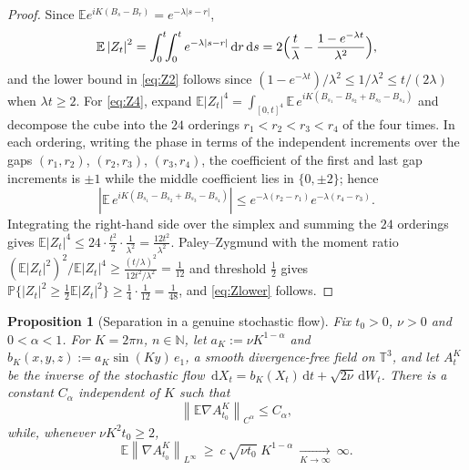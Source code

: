 \documentclass[11pt,reqno]{amsart}
\newcommand{\T}{\mathbb{T}}
\newcommand{\E}{\mathbb{E}}
\newcommand{\Pp}{\mathbb{P}}
\newcommand{\dd}{\,\mathrm{d}}
\newcommand{\norm}[1]{\left\lVert #1\right\rVert}
\newcommand{\abs}[1]{\left\lvert #1\right\rvert}
\newtheorem{proposition}[theorem]{Proposition}
\theoremstyle{definition}
\begin{document}
\begin{proof}
Since $\E e^{iK(B_s-B_r)}=e^{-\lambda\abs{s-r}}$,
\[
  \E\abs{Z_t}^2=\int_0^t\!\!\int_0^t e^{-\lambda\abs{s-r}}\dd r\dd s
  =2\Bigl(\frac{t}{\lambda}-\frac{1-e^{-\lambda t}}{\lambda^2}\Bigr),
\]
and the lower bound in \eqref{eq:Z2} follows since
$(1-e^{-\lambda t})/\lambda^2\le1/\lambda^2\le t/(2\lambda)$ when $\lambda t\ge2$. For
\eqref{eq:Z4}, expand
$\E\abs{Z_t}^4=\int_{[0,t]^4}\E\,e^{iK(B_{s_1}-B_{s_2}+B_{s_3}-B_{s_4})}$ and decompose the
cube into the $24$ orderings $r_1<r_2<r_3<r_4$ of the four times. In each ordering, writing
the phase in terms of the independent increments over the gaps $(r_1,r_2)$, $(r_2,r_3)$,
$(r_3,r_4)$, the coefficient of the first and last gap increments is $\pm1$ while the
middle coefficient lies in $\{0,\pm2\}$; hence
\[
  \abs{\E\,e^{iK(B_{s_1}-B_{s_2}+B_{s_3}-B_{s_4})}}
  \le e^{-\lambda(r_2-r_1)}e^{-\lambda(r_4-r_3)} .
\]
Integrating the right-hand side over the simplex and summing the $24$ orderings gives
$\E\abs{Z_t}^4\le 24\cdot\frac{t^2}{2}\cdot\frac1{\lambda^2}=\frac{12t^2}{\lambda^2}$.
Paley--Zygmund with the moment ratio
$(\E\abs{Z_t}^2)^2/\E\abs{Z_t}^4\ge\frac{(t/\lambda)^2}{12t^2/\lambda^2}=\frac1{12}$ and
threshold $\tfrac12$ gives $\Pp\{\abs{Z_t}^2\ge\tfrac12\E\abs{Z_t}^2\}\ge\frac14\cdot
\frac1{12}=\frac1{48}$, and \eqref{eq:Zlower} follows.
\end{proof}

\begin{proposition}[Separation in a genuine stochastic flow]\label{prop:passiveshear}
Fix $t_0>0$, $\nu>0$ and $0<\alpha<1$. For $K=2\pi n$, $n\in\mathbb N$, let
$a_K:=\nu K^{1-\alpha}$ and $b_K(x,y,z):=a_K\sin(Ky)\,e_1$, a smooth divergence-free field
on $\T^3$, and let $A^K_t$ be the inverse of the stochastic flow
$\dd X_t=b_K(X_t)\dd t+\sqrt{2\nu}\dd W_t$. There is a constant $C_\alpha$ independent of
$K$ such that
\[
  \norm{\E\nabla A^K_{t_0}}_{C^\alpha}\le C_\alpha ,
\]
while, whenever $\nu K^2t_0\ge2$,
\[
  \E\norm{\nabla A^K_{t_0}}_{L^\infty}\ \ge\ c\,\sqrt{\nu t_0}\;K^{1-\alpha}
  \ \xrightarrow[K\to\infty]{}\ \infty .
\]
\end{proposition}
\end{document}
